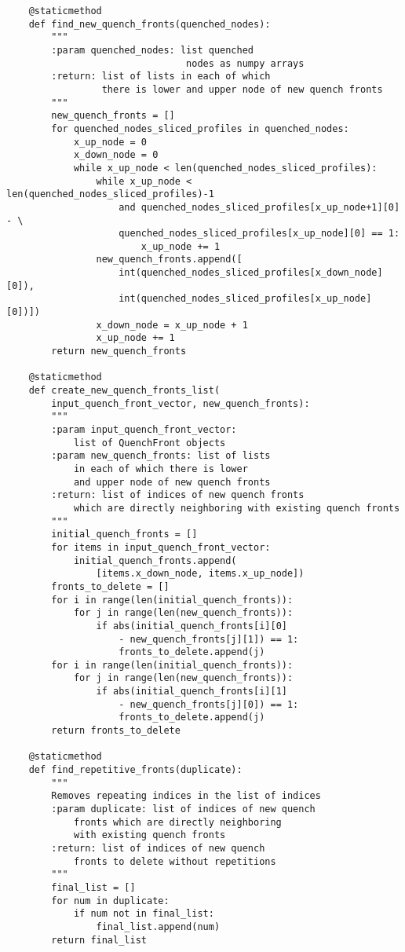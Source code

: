 \begin{verbatim}
    @staticmethod
    def find_new_quench_fronts(quenched_nodes):
        """
        :param quenched_nodes: list quenched 
                                nodes as numpy arrays
        :return: list of lists in each of which 
                 there is lower and upper node of new quench fronts
        """
        new_quench_fronts = []
        for quenched_nodes_sliced_profiles in quenched_nodes:
            x_up_node = 0
            x_down_node = 0
            while x_up_node < len(quenched_nodes_sliced_profiles):
                while x_up_node < len(quenched_nodes_sliced_profiles)-1 
                    and quenched_nodes_sliced_profiles[x_up_node+1][0] - \
                    quenched_nodes_sliced_profiles[x_up_node][0] == 1:
                        x_up_node += 1
                new_quench_fronts.append([
                    int(quenched_nodes_sliced_profiles[x_down_node][0]),
                    int(quenched_nodes_sliced_profiles[x_up_node][0])])
                x_down_node = x_up_node + 1
                x_up_node += 1
        return new_quench_fronts

    @staticmethod
    def create_new_quench_fronts_list(
        input_quench_front_vector, new_quench_fronts):
        """
        :param input_quench_front_vector: 
            list of QuenchFront objects
        :param new_quench_fronts: list of lists 
            in each of which there is lower 
            and upper node of new quench fronts
        :return: list of indices of new quench fronts 
            which are directly neighboring with existing quench fronts
        """
        initial_quench_fronts = []
        for items in input_quench_front_vector:
            initial_quench_fronts.append(
                [items.x_down_node, items.x_up_node])
        fronts_to_delete = []
        for i in range(len(initial_quench_fronts)):
            for j in range(len(new_quench_fronts)):
                if abs(initial_quench_fronts[i][0] 
                    - new_quench_fronts[j][1]) == 1:
                    fronts_to_delete.append(j)
        for i in range(len(initial_quench_fronts)):
            for j in range(len(new_quench_fronts)):
                if abs(initial_quench_fronts[i][1] 
                    - new_quench_fronts[j][0]) == 1:
                    fronts_to_delete.append(j)
        return fronts_to_delete

    @staticmethod
    def find_repetitive_fronts(duplicate):
        """
        Removes repeating indices in the list of indices
        :param duplicate: list of indices of new quench 
            fronts which are directly neighboring 
            with existing quench fronts
        :return: list of indices of new quench 
            fronts to delete without repetitions
        """
        final_list = []
        for num in duplicate:
            if num not in final_list:
                final_list.append(num)
        return final_list


\end{verbatim}
